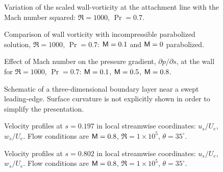 %
\begin{figure}[p]
\centering
{}
\epsfxsize=5.4in 
\caption [Scaled wall-vorticity at the attachment line.]{Variation of the scaled wall-vorticity at the
attachment line with the Mach number squared: $\Re=1000$,
$\Pr=0.7$. \label{f:attach} }
\end{figure}
%
\begin{figure}[p]
\centering
{}
\epsfxsize=5.4in 
\caption [Comparison of wall vorticity with an incompressible parabolized
solution] {Comparison of wall vorticity with incompressible parabolized
solution, $\Re=1000$, $\Pr=0.7$: \solid ${\sf M}=0.1$ and \dashed ${\sf M}=0$
parabolized. \label{f:parabolic} }
\end{figure}
%
\begin{figure}[p]
\centering
{}
\epsfxsize=5.4in 
\caption [Effect of Mach number on the pressure gradient at the wall.] {Effect
of Mach number on the pressure gradient, $\partial p/\partial s$, at the wall
for $\Re=1000$, $\Pr=0.7$: \solid ${\sf M}=0.1$, \dashed ${\sf M}=0.5$, \dotted
${\sf M}=0.8$. \label{f:pg_mach} }
\end{figure}
%
%
%
\begin{figure}[p]
\centering
\epsfxsize=5in 
\caption [Schematic of a three-dimensional boundary layer]{Schematic of a
three-dimensional boundary layer near a swept leading-edge. Surface curvature
is not explicitly shown in order to simplify the presentation. \label{f:3dbl}
}
\end{figure}
%
\begin{figure}[p]
\centering
{}
\epsfxsize=5.4in 
\caption [Velocity profiles at $s=0.197$] {Velocity profiles at $s=0.197$ in
local streamwise coordinates: \solid $u_s/U_e$, \dashed $w_s/U_e$.  Flow
conditions are ${\sf M}=0.8$, $\Re=1\times 10^5$, $\theta=35^\circ$.
\label{f:pro1} }
\end{figure}
%
\begin{figure}[p]
\centering
{}
\epsfxsize=5.4in 
\caption [Velocity profiles at $s=0.802$] {Velocity profiles at $s=0.802$ in
local streamwise coordinates: \solid $u_s/U_e$, \dashed $w_s/U_e$.  Flow
conditions are ${\sf M}=0.8$, $\Re=1\times 10^5$, $\theta=35^\circ$. \label{f:pro2}
}
\end{figure}
